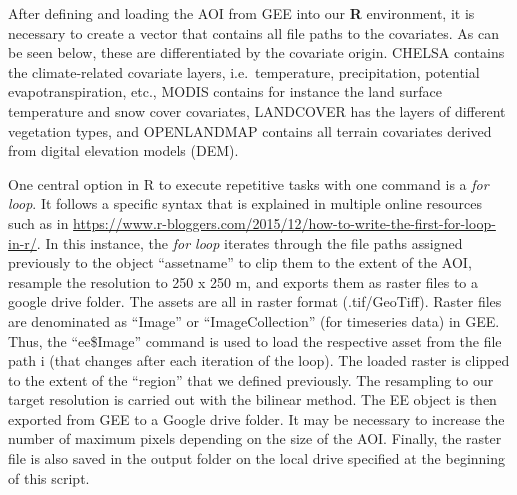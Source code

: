 \documentclass[
  10pt,
  b5paper,
  oneside]{book}
\begin{document}
After defining and loading the AOI from GEE into our \textbf{R} environment, it is necessary to create a vector that contains all file paths to the covariates. As can be seen below, these are differentiated by the covariate origin. CHELSA contains the climate-related covariate layers, i.e.~temperature, precipitation, potential evapotranspiration, etc., MODIS contains for instance the land surface temperature and snow cover covariates, LANDCOVER has the layers of different vegetation types, and OPENLANDMAP contains all terrain covariates derived from digital elevation models (DEM).

One central option in R to execute repetitive tasks with one command is a \emph{for loop}. It follows a specific syntax that is explained in multiple online resources such as in \url{https://www.r-bloggers.com/2015/12/how-to-write-the-first-for-loop-in-r/}. In this instance, the \emph{for loop} iterates through the file paths assigned previously to the object ``assetname'' to clip them to the extent of the AOI, resample the resolution to 250 x 250 m, and exports them as raster files to a google drive folder.
The assets are all in raster format (.tif/GeoTiff). Raster files are denominated as ``Image'' or ``ImageCollection'' (for timeseries data) in GEE. Thus, the ``ee\$Image'' command is used to load the respective asset from the file path i (that changes after each iteration of the loop). The loaded raster is clipped to the extent of the ``region'' that we defined previously. The resampling to our target resolution is carried out with the bilinear method. The EE object is then exported from GEE to a Google drive folder. It may be necessary to increase the number of maximum pixels depending on the size of the AOI. Finally, the raster file is also saved in the output folder on the local drive specified at the beginning of this script.
\end{document}
